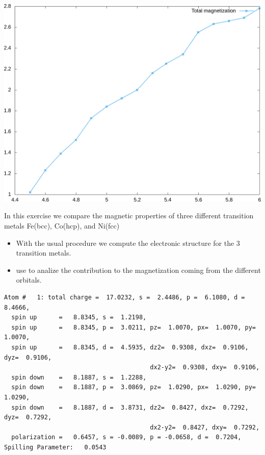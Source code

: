 \documentclass[landscape]{foils}
\begin{document}
\vfill
\begin{center}
  \includegraphics[width=17cm]{figs/mag_v_vol.png}
\end{center}
\vfill
  In this exercise we compare the magnetic properties of three different 
  transition metals Fe(bcc), Co(hcp), and Ni(fcc)
  \begin{itemize}
    \item With the usual procedure we compute the electronic structure for the  3 transition 
          metals.
    \item use  to analize the contribution to the magnetization coming from 
       the different orbitals.
  \end{itemize}
\begin{Verbatim}[fontsize=\small]
  Atom #   1: total charge =  17.0232, s =  2.4486, p =  6.1080, d =  8.4666, 
  spin up      =   8.8345, s =  1.2198, 
  spin up      =   8.8345, p =  3.0211, pz=  1.0070, px=  1.0070, py=  1.0070, 
  spin up      =   8.8345, d =  4.5935, dz2=  0.9308, dxz=  0.9106, dyz=  0.9106, 
                                        dx2-y2=  0.9308, dxy=  0.9106, 
  spin down    =   8.1887, s =  1.2288, 
  spin down    =   8.1887, p =  3.0869, pz=  1.0290, px=  1.0290, py=  1.0290, 
  spin down    =   8.1887, d =  3.8731, dz2=  0.8427, dxz=  0.7292, dyz=  0.7292, 
                                        dx2-y2=  0.8427, dxy=  0.7292, 
  polarization =   0.6457, s = -0.0089, p = -0.0658, d =  0.7204, 
Spilling Parameter:   0.0543
\end{Verbatim}
\end{document}
